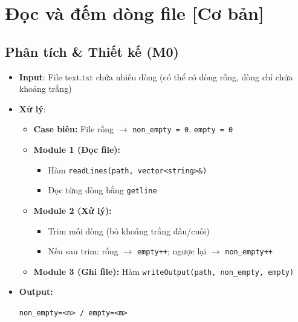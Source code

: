 \section{Đọc và đếm dòng file [Cơ bản]}
\subsection{Phân tích \& Thiết kế (M0)}
    \begin{itemize}
        \item \textbf{Input}: File text.txt chứa nhiều dòng (có thể có dòng rỗng, dòng chỉ chứa khoảng trắng)
        \item \textbf{Xử lý}:
        \begin{itemize}
            \item \textbf{Case biên:} File rỗng $\rightarrow$ \texttt{non\_empty = 0}, \texttt{empty = 0}
            \item \textbf{Module 1 (Đọc file):}
            \begin{itemize}
                \item Hàm \texttt{readLines(path, vector<string>\&)}
                \item Đọc từng dòng bằng \texttt{getline}
            \end{itemize}
            \item \textbf{Module 2 (Xử lý):}
            \begin{itemize}
                \item Trim mỗi dòng (bỏ khoảng trắng đầu/cuối)
                \item Nếu sau trim: rỗng $\rightarrow$ \texttt{empty++}; ngược lại $\rightarrow$ \texttt{non\_empty++}
            \end{itemize}
            \item \textbf{Module 3 (Ghi file):} Hàm \texttt{writeOutput(path, non\_empty, empty)}
        \end{itemize}
        \item \textbf{Output:}
        \begin{center}
        \texttt{non\_empty=<n> / empty=<m>}
        \end{center}
    \end{itemize}

